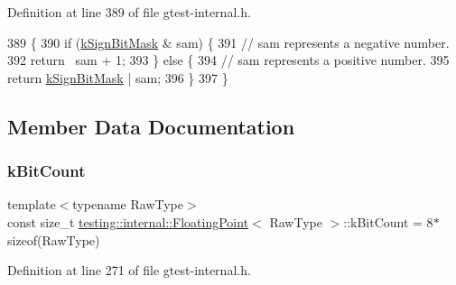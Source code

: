Definition at line 389 of file gtest-\/internal.\+h.


\begin{DoxyCode}
389                                                         \{
390     \textcolor{keywordflow}{if} (\hyperlink{classtesting_1_1internal_1_1FloatingPoint_aca98b5ea6f2222a66a82e52421682efa}{kSignBitMask} & sam) \{
391       \textcolor{comment}{// sam represents a negative number.}
392       \textcolor{keywordflow}{return} ~sam + 1;
393     \} \textcolor{keywordflow}{else} \{
394       \textcolor{comment}{// sam represents a positive number.}
395       \textcolor{keywordflow}{return} \hyperlink{classtesting_1_1internal_1_1FloatingPoint_aca98b5ea6f2222a66a82e52421682efa}{kSignBitMask} | sam;
396     \}
397   \}
\end{DoxyCode}


\subsection{Member Data Documentation}
\mbox{\label{classtesting_1_1internal_1_1FloatingPoint_ab819d2e8f93e9e482373999f0f8d71b9}} 
\subsubsection{\texorpdfstring{k\+Bit\+Count}{kBitCount}}
{\footnotesize\ttfamily template$<$typename Raw\+Type$>$ \\
const size\+\_\+t \hyperlink{classtesting_1_1internal_1_1FloatingPoint}{testing\+::internal\+::\+Floating\+Point}$<$ Raw\+Type $>$\+::k\+Bit\+Count = 8$\ast$sizeof(Raw\+Type)\hspace{0.3cm}{\ttfamily [static]}}



Definition at line 271 of file gtest-\/internal.\+h.

\mbox{\label{classtesting_1_1internal_1_1FloatingPoint_a1973d843c00781053d3073daa8a40119}} 
